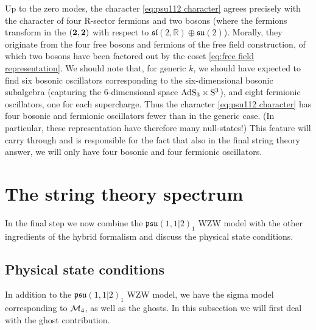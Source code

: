 \documentclass[12pt,a4paper]{article}
\begin{document}
Up to the zero modes, the character \eqref{eq:psu112 character} agrees precisely with the character of four R-sector fermions and two bosons (where the fermions transform in the $({\bf 2},{\bf 2})$ with respect to 
$\mathfrak{sl}(2,\mathds{R}) \oplus \mathfrak{su}(2)$). Morally, they originate from the four free bosons and fermions of the free field construction, of which two bosons have been factored out by the coset \eqref{eq:free field representation}. We should note that, for generic $k$, we should have expected to find six bosonic oscillators corresponding to the six-dimensional bosonic subalgebra (capturing the $6$-dimensional space ${\rm AdS}_3 \times {\rm S}^3$), and eight fermionic oscillators, one for each supercharge. Thus the character \eqref{eq:psu112 character} has four bosonic and fermionic oscillators fewer than in the generic case. (In particular, these representation have therefore many null-states!) This feature will carry through and is responsible for the fact that also in the final string theory answer, we will only have four bosonic and four fermionic oscillators. 

\section{The string theory spectrum} \label{sec:string theory partition function}

In the final step we now combine the $\mathfrak{psu}(1,1|2)_1$ WZW model with the other ingredients of the hybrid formalism and discuss the physical state conditions.

\subsection{Physical state conditions} \label{subsec:physical state conditions}
In addition to the $\mathfrak{psu}(1,1|2)_1$ WZW model, we have the sigma model corresponding to ${\cal M}_4$, as well as the ghosts. In this subsection we will first deal with the ghost contribution.
\end{document}
